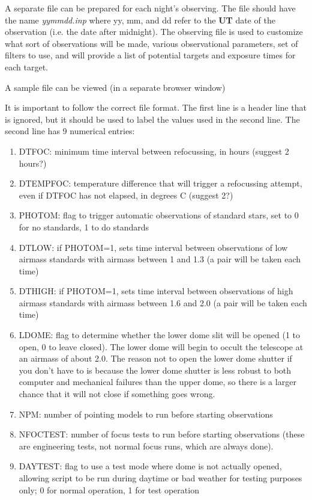 A separate file can be prepared for each night's observing. The file should
have the name \textit{yymmdd.inp} where yy, mm, and dd refer to the 
\textbf{UT} date of the observation (i.e. the date after midnight).
The observing file is used to customize what sort of observations will be
made, various observational parameters, set of filters to use, and will
provide a list of potential targets and exposure times for each target.

A sample file can be viewed (in a separate browser window) 

It is important to follow the correct file format. The first line is
a header line that is ignored, but it should be used to label the values
used in the second line.
The second line has 9 numerical entries:
\begin{enumerate}
  \item DTFOC:  minimum time interval between refocussing, in hours (suggest 2 
     hours?)
  \item DTEMPFOC: temperature difference that will trigger a refocussing 
     attempt, even if DTFOC has not elapsed, in degrees C (suggest 2?)
  \item PHOTOM:  flag to trigger automatic observations of standard stars,
     set to 0 for no standards, 1 to do standards
  \item DTLOW:  if PHOTOM=1, sets time interval between observations of low
     airmass standards with airmass between 1 and 1.3 
     (a pair will be taken each time)
  \item DTHIGH:  if PHOTOM=1, sets time interval between observations of high
     airmass standards with airmass between 1.6 and 2.0 
     (a pair will be taken each time)
  \item LDOME:  flag to determine whether the lower dome slit will be opened
     (1 to open, 0 to leave closed). The lower dome will begin to occult
     the telescope at an airmass of about 2.0. The reason not to open the
     lower dome shutter if you don't have to is because the lower dome
     shutter is less robust to both computer and mechanical failures than
     the upper dome, so there is a larger chance that it will not close if
     something goes wrong.
  \item NPM: number of pointing models to run before starting observations
  \item NFOCTEST: number of focus tests to run before starting observations
     (these are engineering tests, not normal focus runs, which are always
     done).
  \item DAYTEST: flag to use a test mode where dome is not actually opened,
     allowing script to be run during daytime or bad weather for testing
     purposes only; 0 for normal operation, 1 for test operation
\end{enumerate}

